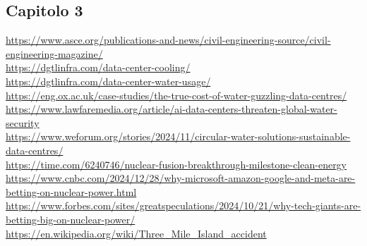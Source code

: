 \documentclass[12pt,a4paper,oneside]{book}
\begin{document}
\subsection*{Capitolo 3}
\url{https://www.asce.org/publications-and-news/civil-engineering-source/civil-engineering-magazine/} \\
\url{https://dgtlinfra.com/data-center-cooling/} \\
\url{https://dgtlinfra.com/data-center-water-usage/} \\
\url{https://eng.ox.ac.uk/case-studies/the-true-cost-of-water-guzzling-data-centres/} \\
\url{https://www.lawfaremedia.org/article/ai-data-centers-threaten-global-water-security} \\
\url{https://www.weforum.org/stories/2024/11/circular-water-solutions-sustainable-data-centres/}\\
\url{https://time.com/6240746/nuclear-fusion-breakthrough-milestone-clean-energy}\\
\url{https://www.cnbc.com/2024/12/28/why-microsoft-amazon-google-and-meta-are-betting-on-nuclear-power.html}\\
\url{https://www.forbes.com/sites/greatspeculations/2024/10/21/why-tech-giants-are-betting-big-on-nuclear-power/}\\
\url{https://en.wikipedia.org/wiki/Three_Mile_Island_accident}

\newpage
\end{document}
